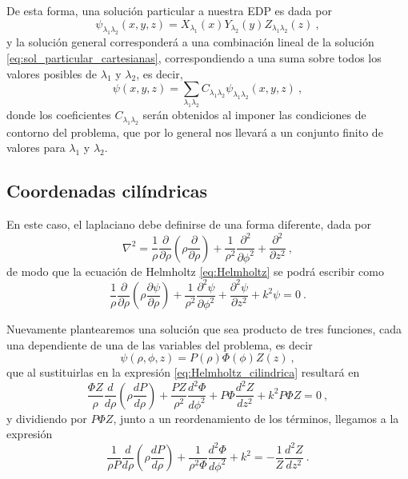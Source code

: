 De esta forma, una solución particular a nuestra EDP es dada por
\begin{equation} \label{eq:sol_particular_cartesianas}
    \psi_{\lambda_1 \lambda_2}(x,y,z) = X_{\lambda_1}(x) Y_{\lambda_2}(y) Z_{\lambda_1 \lambda_2}(z) \ ,
\end{equation}
y la solución general corresponderá a una combinación lineal de la solución \eqref{eq:sol_particular_cartesianas}, correspondiendo a una suma sobre todos los valores posibles de $\lambda_1$ y $\lambda_2$, es decir,
\begin{equation}
    \psi(x,y,z) = \sum_{\lambda_1 \lambda_2} C_{\lambda_1 \lambda_2} \psi_{\lambda_1 \lambda_2}(x,y,z) \ ,
\end{equation}
donde los coeficientes $C_{\lambda_1 \lambda_2}$ serán obtenidos al imponer las condiciones de contorno del problema, que por lo general nos llevará a un conjunto finito de valores para $\lambda_1$ y $\lambda_2$.


\subsection{Coordenadas cilíndricas}

En este caso, el laplaciano debe definirse de una forma diferente, dada por
\begin{equation}
    \nabla^2 = \frac{1}{\rho} \frac{\partial}{\partial \rho} \left( \rho \frac{\partial}{\partial \rho} \right) + \frac{1}{\rho^2} \frac{\partial^2}{\partial \phi^2} + \frac{\partial^2}{\partial z^2} \ , 
\end{equation}
de modo que la ecuación de Helmholtz \eqref{eq:Helmholtz} se podrá escribir como
\begin{equation} \label{eq:Helmholtz_cilindrica}
    \frac{1}{\rho} \frac{\partial}{\partial \rho} \left( \rho \frac{\partial \psi}{\partial \rho} \right) + \frac{1}{\rho^2} \frac{\partial^2 \psi}{\partial \phi^2} + \frac{\partial^2 \psi}{\partial z^2} + k^2 \psi = 0 \ .
\end{equation}

Nuevamente plantearemos una solución que sea producto de tres funciones, cada una dependiente de una de las variables del problema, es decir
\begin{equation}
    \psi(\rho, \phi, z) = P(\rho) \Phi(\phi) Z(z) \ ,
\end{equation}
que al sustituirlas en la expresión \eqref{eq:Helmholtz_cilindrica} resultará en
\begin{equation}
    \frac{\Phi Z}{\rho} \frac{d}{d\rho}\left( \rho \frac{dP}{d\rho} \right) + \frac{PZ}{\rho^2} \frac{d^2 \Phi}{d\phi^2} + P\Phi \frac{d^2Z}{dz^2} + k^2 P\Phi Z = 0 \ ,
\end{equation}
y dividiendo por $P\Phi Z$, junto a un reordenamiento de los términos, llegamos a la expresión
\begin{equation}
    \frac{1}{\rho P} \frac{d}{d\rho} \left( \rho \frac{dP}{d\rho} \right) + \frac{1}{\rho^2 \Phi} \frac{d^2\Phi}{d\phi^2} + k^2 = - \frac{1}{Z} \frac{d^2Z}{dz^2} \ .
\end{equation}

